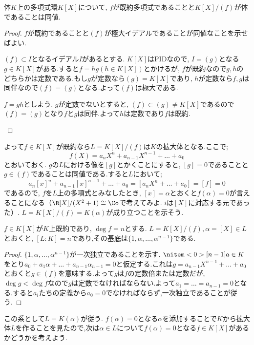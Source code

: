 \begin{prop}
	体$K$上の多項式環$K[X]$について, $f$が既約多項式であることと$K[X]/(f)$が体であることは同値.
\end{prop}

\begin{proof}
	$f$が既約であることと$(f)$が極大イデアルであることが同値なことを示せばよい.
	
	\begin{eqv}
		\item $(f)\subset I$となるイデアル$I$があるとする. $K[X]$はPIDなので, $I=(g)$となる$g\in K[X]$がある.すると$f=hg (h\in K[X])$とかけるが, $f$が既約なので$g,h$のどちらかは定数である.もし$g$が定数なら$(g)=K[X]$であり, $h$が定数なら$f,g$は同伴なので$(f)=(g)$となる.よって$(f)$は極大である.
		\item $f=gh$としよう. $g$が定数でないとすると, $(f)\subset(g)\neq K[X]$であるので$(f)=(g)$となり$f$と$g$は同伴.よって$h$は定数であり$f$は既約.
	\end{eqv}
\end{proof}

よって$f\in K[X]$が既約なら$L=K[X]/(f)$は$K$の拡大体となる.ここで;
\[f(X)=a_nX^n+a_{n-1}X^{n-1}+\dots+a_0\]
とおいておく. $g$の$L$における像を$[g]$とかくことにすると, $[g]=0$であることと$g\in (f)$であることは同値である.すると$L$において;
\[a_n[x]^n+a_{n-1}[x]^{n-1}+\dots+a_0=[a_nX^n+\dots+a_0]=[f]=0\]
であるので, $f$を$L$上の多項式とみなしたとき, $[x]=\alpha$とおくと$f(\alpha)=0$が言えることになる（$\R[X]/(X^2+1)\cong\Co$で考えてみよ. $i$は$[X]$に対応する元であった）. $L=K[X]/(f)=K(\alpha)$が成り立つことを示そう.

\begin{prop}\label{prop:既約多項式の商による拡大}
	$f\in K[X]$が$K$上既約であり, $\deg f=n$とする. $L=K[X]/(f),\alpha=[X]\in L$とおくと, $[L:K]=n$であり,その基底は$\{1,\alpha,\dots,\alpha^{n-1}\}$である.
\end{prop}

\begin{proof}
	$\{1,\alpha,\dots,\alpha^{n-1}\}$が一次独立であることを示す. $\nitem<0>[n-1]{a}\in K$をとり$a_0+a_1\alpha+\dots+a_{n-1}\alpha_{n-1}=0$と仮定する.これは$g=a_{n-1}X^{n-1}+\dots+a_0$とおくと$g\in (f)$を意味する.よって$g$は$f$の定数倍または定数だが, $\deg g<\deg f$なので$g$は定数でなければならない.よって$a_1=\dots=a_{n-1}=0$となる.すると$a_i$たちの定義から$a_0=0$でなければならず,一次独立であることが従う.
\end{proof}

この系として$L= K(\alpha)$が従う. $f(\alpha)=0$となる$\alpha$を添加することで$K$から拡大体$L$を作ることを見たので,次は$\alpha\in L$について$f(\alpha)=0$となる$f\in K[X]$があるかどうかを考えよう.

